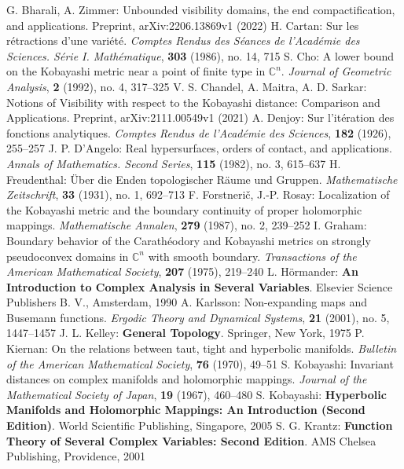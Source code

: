 \begin{thebibliography}{widest entry}
   G. Bharali, A. Zimmer: Unbounded visibility domains, the end compactification, and applications. Preprint, arXiv:2206.13869v1 (2022)
   H. Cartan: Sur les rétractions d'une variété. \textit{Comptes Rendus des Séances de l'Académie des Sciences. Série I. Mathématique}, \textbf{303} (1986), no. 14, 715
   S. Cho: A lower bound on the Kobayashi metric near a point of finite type in $\mathbb{C}^n$. \textit{Journal of Geometric Analysis}, \textbf{2} (1992), no. 4, 317--325
   V. S. Chandel, A. Maitra, A. D. Sarkar: Notions of Visibility with respect to the Kobayashi distance: Comparison and Applications. Preprint, arXiv:2111.00549v1 (2021)
   A. Denjoy: Sur l'itération des fonctions analytiques. \textit{Comptes Rendus de l'Académie des Sciences}, \textbf{182} (1926), 255--257
   J. P. D'Angelo: Real hypersurfaces, orders of contact, and applications. \textit{Annals of Mathematics. Second Series}, \textbf{115} (1982), no. 3, 615--637
   H. Freudenthal: Über die Enden topologischer Räume und Gruppen. \textit{Mathematische Zeitschrift}, \textbf{33} (1931), no. 1, 692--713
   F. Forstnerič, J.-P. Rosay: Localization of the Kobayashi metric and the boundary continuity of proper holomorphic mappings. \textit{Mathematische Annalen}, \textbf{279} (1987), no. 2, 239--252
   I. Graham: Boundary behavior of the Carathéodory and Kobayashi metrics on strongly pseudoconvex domains in $\mathbb{C}^n$ with smooth boundary. \textit{Transactions of the American Mathematical Society}, \textbf{207} (1975), 219--240
   L. Hörmander: \textbf{An Introduction to Complex Analysis in Several Variables}. Elsevier Science Publishers B. V., Amsterdam, 1990
   A. Karlsson: Non-expanding maps and Busemann functions. \textit{Ergodic Theory and Dynamical Systems}, \textbf{21} (2001), no. 5, 1447--1457
   J. L. Kelley: \textbf{General Topology}. Springer, New York, 1975
   P. Kiernan: On the relations between taut, tight and hyperbolic manifolds. \textit{Bulletin of the American Mathematical Society}, \textbf{76} (1970), 49--51
   S. Kobayashi: Invariant distances on complex manifolds and holomorphic mappings. \textit{Journal of the Mathematical Society of Japan}, \textbf{19} (1967), 460--480
   S. Kobayashi: \textbf{Hyperbolic Manifolds and Holomorphic Mappings: An Introduction (Second Edition)}. World Scientific Publishing, Singapore, 2005
   S. G. Krantz: \textbf{Function Theory of Several Complex Variables: Second Edition}. AMS Chelsea Publishing, Providence, 2001

\end{thebibliography}
